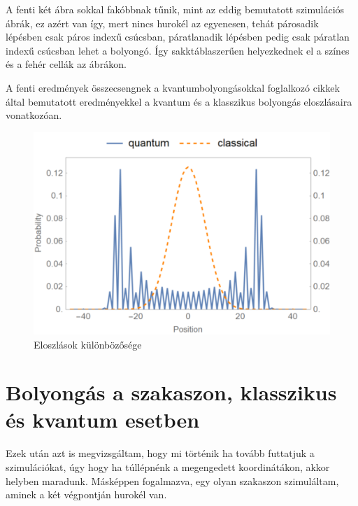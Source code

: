 A fenti két ábra sokkal fakóbbnak tűnik, mint az eddig bemutatott szimulációs
ábrák, ez azért van így, mert nincs hurokél az egyenesen, tehát párosadik
lépésben csak páros indexű csúcsban, páratlanadik lépésben pedig csak páratlan
indexű csúcsban lehet a bolyongó. Így sakktáblaszerűen helyezkednek el a színes
és a fehér cellák az ábrákon.

A fenti eredmények összecsengnek a kvantumbolyongásokkal foglalkozó cikkek
által bemutatott eredményekkel a kvantum és a klasszikus bolyongás eloszlásaira
vonatkozóan.

\begin{figure}[H]
  \centering
  \includegraphics[width=0.5\linewidth]{./figures/quantum/teve.png}
  \caption{Eloszlások különbözősége \cite{VicPina}}
\end{figure}

\section{Bolyongás a szakaszon, klasszikus és kvantum esetben}

Ezek után azt is megvizsgáltam, hogy mi történik ha tovább futtatjuk a
szimulációkat, úgy hogy ha túllépnénk a megengedett koordinátákon, akkor
helyben maradunk. Másképpen fogalmazva, egy olyan szakaszon szimuláltam, aminek
a két végpontján hurokél van.

